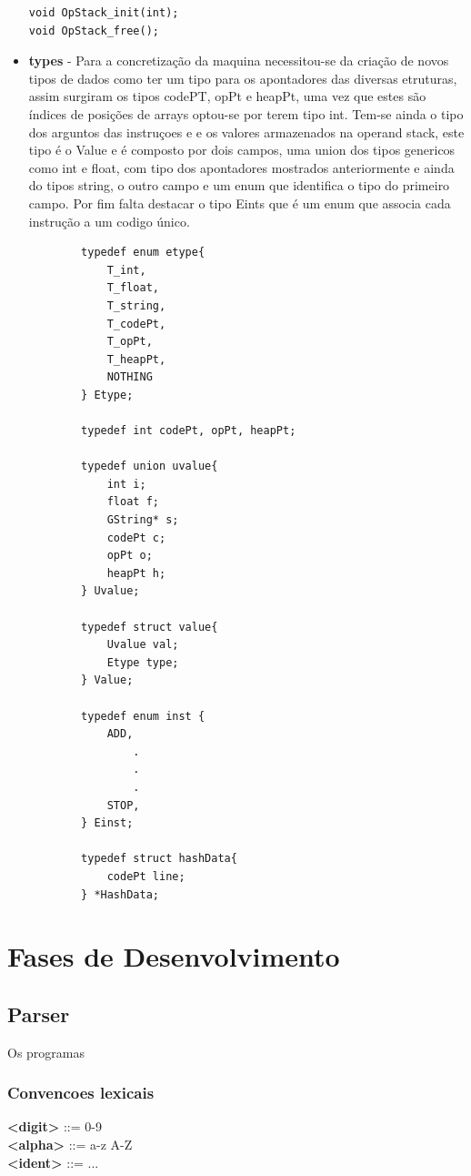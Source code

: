 \documentclass{report}
\begin{document}
\begin{itemize}
\begin{verbatim}
void OpStack_init(int);
void OpStack_free();
	\end{verbatim}


	\item \textbf{types} - Para a concretização da maquina necessitou-se da criação de novos tipos de dados como ter um tipo para os apontadores das diversas etruturas, assim surgiram os tipos codePT, opPt e heapPt, uma vez que estes são índices de posições de arrays optou-se por terem tipo int. Tem-se ainda o tipo dos arguntos das instruçoes e e os valores armazenados na operand stack, este tipo é o Value e é composto por dois campos, uma union dos tipos genericos como int e float, com tipo dos apontadores mostrados anteriormente e ainda do tipos string, o outro campo e um enum que identifica o tipo do primeiro campo. Por fim falta destacar o tipo Eints que é um enum que associa cada instrução a um codigo único.
	\begin{verbatim}
		typedef enum etype{
		    T_int,
		    T_float,
		    T_string,
		    T_codePt,
		    T_opPt,
		    T_heapPt,
		    NOTHING
		} Etype;

		typedef int codePt, opPt, heapPt;

		typedef union uvalue{
		    int i;
		    float f;
		    GString* s;
		    codePt c;
		    opPt o;
		    heapPt h;
		} Uvalue;

		typedef struct value{
		    Uvalue val;
		    Etype type;
		} Value;

		typedef enum inst {
		    ADD,
				.
				.
				.
		    STOP,
		} Einst;

		typedef struct hashData{
		    codePt line;
		} *HashData;
	\end{verbatim}
\end{itemize}
\section{Fases de Desenvolvimento}
\subsection{Parser}
Os programas

\subsubsection{Convencoes lexicais}

\null\quad \textbf{\textless digit\textgreater}  ::= 0-9\\
\null\quad \textbf{\textless alpha\textgreater} ::= a-z \textvertline\space A-Z\\
\null\quad \textbf{\textless ident\textgreater} ::= ...
\end{document}
